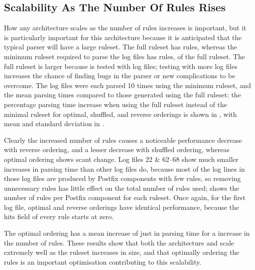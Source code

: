 \FloatBarrier{}

\subsection{Scalability As The Number Of Rules Rises}

\label{scalability as the number of rules rises}

How any architecture scales as the number of rules increases is important,
but it is particularly important for this architecture because it is
anticipated that the typical parser will have a large ruleset.  The full
\parsername{} ruleset has \numberOFrules{} rules, whereas the minimum
ruleset required to parse the \numberOFlogFILES{} log files has
\numberOFrulesMINIMUM{} rules, \numberOFrulesMINIMUMpercentage{} of the
full ruleset.  The full ruleset is larger because \parsername{} is tested
with \numberOFlogFILESall{} log files; testing with more log files
increases the chance of finding bugs in the parser or new complications to
be overcome.  The \numberOFlogFILES{} log files were each parsed 10 times
using the minimum ruleset, and the mean parsing times compared to those
generated using the full ruleset: the percentage parsing time increase when
using the full ruleset instead of the minimal ruleset for optimal,
shuffled, and reverse orderings is shown in , with mean and standard deviation in .

Clearly the increased number of rules causes a noticeable performance
decrease with reverse ordering, and a lesser decrease with shuffled
ordering, whereas optimal ordering shows scant change.  Log files 22 \&
62--68 show much smaller increases in parsing time than other log files do,
because most of the log lines in those log files are produced by Postfix
components with few rules, so removing unnecessary rules has little effect
on the total number of rules used;  shows the number of rules
per Postfix component for each ruleset.  Once again, for the first log
file, optimal and reverse orderings have identical performance, because the
hits field of every rule starts at zero.

The optimal ordering has a mean increase of just
 in parsing time
for a \numberOFrulesMAXIMUMpercentage{} increase in the number of rules.
These results show that both the architecture and \parsername{} scale
extremely well as the ruleset increases in size, and that optimally
ordering the rules is an important optimisation contributing to this
scalability.

